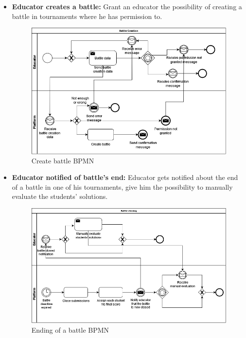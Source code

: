 \documentclass{article}
\begin{document}
{\begin{itemize}
            \item \textbf{Educator creates a battle:} Grant an educator the possibility of creating a battle in tournaments where he has permission to.
            \begin{figure}[H]
                \centering
                \includegraphics[scale=0.4]{images/BPMN/BattleCreation.png}
                \caption{Create battle BPMN}
                \label{fig:createBattleBPMN}
            \end{figure}

            \item \textbf{Educator notified of battle's end:} Educator gets notified about the end of a battle in one of his tournaments, give him the possibility to manually evaluate the students' solutions.
            \begin{figure}[H]
                \centering
                \includegraphics[scale=0.4]{images/BPMN/BattleClosing.png}
                \caption{Ending of a battle BPMN}
                \label{fig:battleEndingBPMN}
            \end{figure}
        \end{itemize}
}
\end{document}
